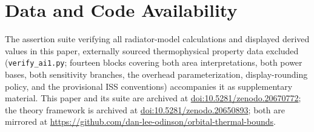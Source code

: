 \documentclass[11pt]{article}
\begin{document}
\section*{Data and Code Availability}

The assertion suite verifying all radiator-model calculations and displayed derived values in this paper, externally sourced thermophysical property data excluded (\texttt{verify\_ai1.py}; fourteen blocks covering both area interpretations, both power bases, both sensitivity branches, the overhead parameterization, display-rounding policy, and the provisional ISS conventions) accompanies it as supplementary material. This paper and its suite are archived at \href{https://doi.org/10.5281/zenodo.20670772}{doi:10.5281/zenodo.20670772}; the theory framework is archived at \href{https://doi.org/10.5281/zenodo.20650893}{doi:10.5281/zenodo.20650893}; both are mirrored at \url{https://github.com/dan-lee-odinson/orbital-thermal-bounds}.
\end{document}
